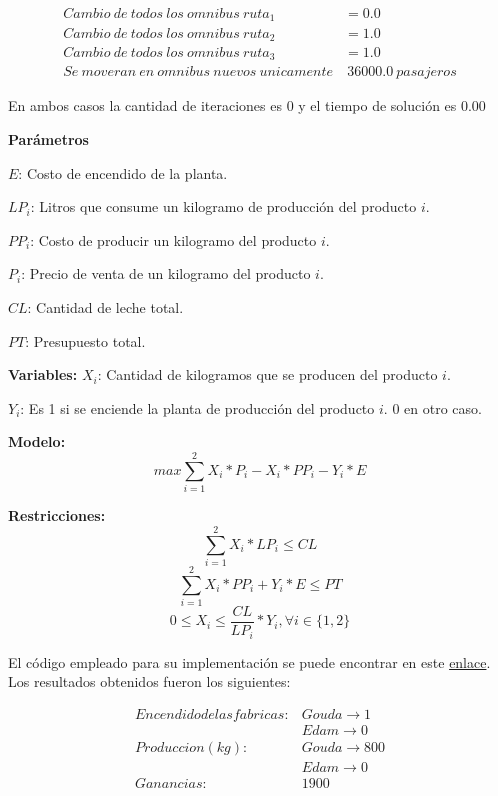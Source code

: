 \documentclass[titlepage, 11pt]{scrartcl}
\begin{document}
{\begin{description}
			\begin{align*}
				Cambio \ de \ todos \ los \ omnibus \ ruta_1 &= 0.0 \\
				Cambio \ de \ todos \ los \ omnibus \ ruta_2 &= 1.0 \\
				Cambio \ de \ todos \ los \ omnibus \ ruta_3 &= 1.0 \\
    			Se \ moveran \ en \ omnibus \ nuevos \ unicamente &\ 36000.0 \  pasajeros
			\end{align*}    		
    		
    		En ambos casos la cantidad de iteraciones es 0 y el tiempo de soluci\'on es 0.00
    		
    		\item[2] 
    		
    		\textbf{Parámetros}

    				$E$: Costo de encendido de la planta.
    				
    				$LP_i$: Litros que consume un kilogramo de producción del producto $i$.
    				
    				$PP_i$: Costo de producir un kilogramo del producto $i$.
    				
    				$P_i$: Precio de venta de un kilogramo del producto $i$.
    				
    				$CL$: Cantidad de leche total.
    				
    				$PT$: Presupuesto total.
    		
    		\textbf{Variables:}
    				$X_i$: Cantidad de kilogramos que se producen del producto $i$.
    				
    				$Y_i$: Es 1 si se enciende la planta de producción del producto $i$. 0 en otro caso.

    		
    		\textbf{Modelo:}
    			$$max \sum_{i=1}^{2}X_i * P_i - X_i * PP_i - Y_i * E$$
    		
    		
    		\textbf{Restricciones:}
    			$$\sum_{i=1}^{2}X_i*LP_i \leq CL$$
    			$$\sum_{i=1}^{2}X_i * PP_i + Y_i * E \leq PT$$
    			$$0 \leq X_i \leq \frac{CL}{LP_i} * Y_i, \forall i \in \{1, 2\}$$
    		
    		
			El c\'odigo empleado para su implementaci\'on se puede encontrar en este \href{lab2ex1.py}{enlace}. Los resultados obtenidos fueron los siguientes:
			
			\begin{align*}
				Encendido de las fabricas:& Gouda \rightarrow 1\\
				& Edam \rightarrow 0\\
				Produccion (kg):& Gouda \rightarrow 800\\
				& Edam \rightarrow 0	\\
				Ganancias: & 1900		
			\end{align*}
			

\end{description}}
\end{document}
